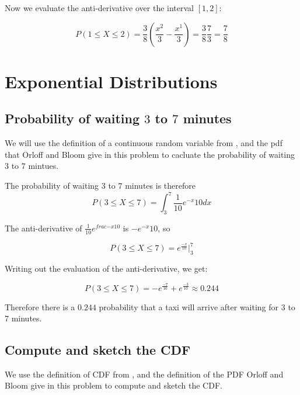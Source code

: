 \documentclass[a4paper,11pt]{article}
\begin{document}
Now we evaluate the anti-derivative over the interval $\left[ 1, 2 \right]$:

\begin{equation}
P \left( 1 \leq X \leq 2 \right)
  = \frac{3}{8} \left( \frac{x^{2}}{3} - \frac{x^{1}}{3} \right)
  = \frac{3}{8} \frac{7}{3}
  = \frac{7}{8}
\end{equation}

\section{Exponential Distributions}
\subsection{Probability of waiting $3$ to $7$ minutes}
We will use the definition of a continuous random variable 
from \cite{reading5b}, and the pdf that Orloff and Bloom give
in this problem to cacluate the probability of waiting $3$
to $7$ mintues.

The probability of waiting $3$ to $7$ minutes is therefore
\begin{equation}
P \left( 3 \leq X \leq 7 \right) 
  = \int_{3}^{7} \frac{1}{10}e^{-x}{10} dx
\end{equation}

The anti-derivative of $\frac{1}{10}e^{frac{-x}{10}}$ is $-e^{-x}{10}$, \cite{expInt}so

\begin{equation}
P \left( 3 \leq X \leq 7 \right) 
  = e^{\frac{-x}{10}} \bigg\rvert_{3}^{7}
\end{equation}

Writing out the evaluation of the anti-derivative, we get:

\begin{equation}
P \left( 3 \leq X \leq 7 \right) 
  = -e^{\frac{-7}{10}} + e^{\frac{-3}{10}} \approx 0.244
\end{equation}

Therefore there is a $0.244$ probability that a taxi will
arrive after waiting for $3$ to $7$ minutes.

\subsection{Compute and sketch the CDF}

We use the definition of CDF from \cite{reading5b}, and the definition
of the PDF Orloff and Bloom give in this problem to compute
and sketch the CDF.
\end{document}
